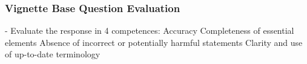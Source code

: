 
\subsubsection{Vignette Base Question Evaluation}
- Evaluate the response in 4 competences:
Accuracy
Completeness of essential elements
Absence of incorrect or potentially harmful
statements
Clarity and use of up-to-date terminology
